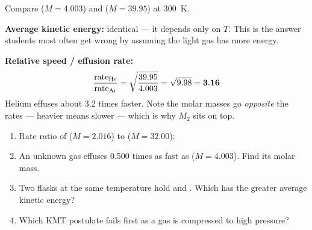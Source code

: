 \documentclass{apchem-worksheet}
\begin{document}
\begin{workedexample}
Compare  ($M = 4.003$) and  ($M = 39.95$) at
\SI{300}{\kelvin}.

\textbf{Average kinetic energy:} identical --- it depends only on $T$.
This is the answer students most often get wrong by assuming the light
gas has more energy.

\textbf{Relative speed / effusion rate:}
\[ \frac{\text{rate}_{\ce{He}}}{\text{rate}_{\ce{Ar}}}
   = \sqrt{\frac{39.95}{4.003}} = \sqrt{9.98} = \mathbf{3.16} \]
Helium effuses about 3.2 times faster. Note the molar masses go
\emph{opposite} the rates --- heavier means slower --- which is why $M_2$
sits on top.
\end{workedexample}

\begin{yourturn}
\begin{enumerate}[leftmargin=*,itemsep=0.5em]
  \item Rate ratio of  ($M = 2.016$) to  ($M = 32.00$):
        \workspace[1.6cm]
  \item An unknown gas effuses 0.500 times as fast as 
        ($M = 4.003$). Find its molar mass. \workspace[1.8cm]
  \item Two flasks at the same temperature hold  and .
        Which has the greater average kinetic energy? \workspace[1.4cm]
  \item Which KMT postulate fails first as a gas is compressed to high
        pressure? \workspace[1.6cm]
\end{enumerate}
\end{yourturn}

\end{document}
